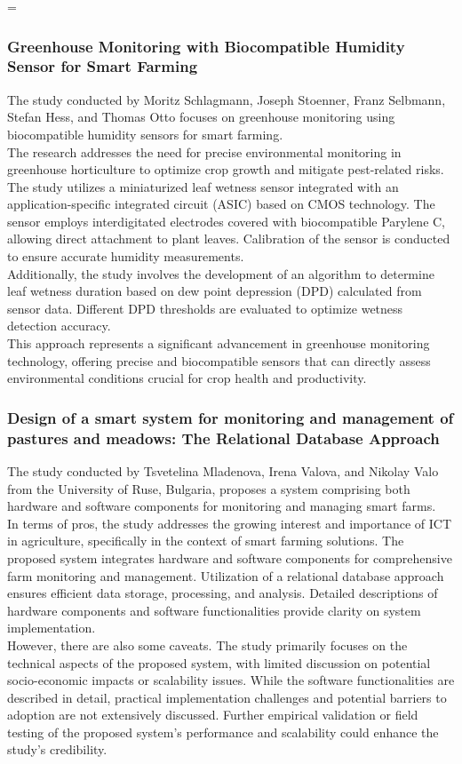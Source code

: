 =\documentclass[12pt, a4paper]{article}
\begin{document}
\subsubsection{Greenhouse Monitoring with Biocompatible Humidity Sensor for Smart Farming}
The study conducted by Moritz Schlagmann, Joseph Stoenner, Franz Selbmann, Stefan Hess, and Thomas Otto \cite{schlagmann2023greenhouse} focuses on greenhouse monitoring using biocompatible humidity sensors for smart farming.\\
The research addresses the need for precise environmental monitoring in greenhouse horticulture to optimize crop growth and mitigate pest-related risks.\\
The study utilizes a miniaturized leaf wetness sensor integrated with an application-specific integrated circuit (ASIC) based on CMOS technology. The sensor employs interdigitated electrodes covered with biocompatible Parylene C, allowing direct attachment to plant leaves. Calibration of the sensor is conducted to ensure accurate humidity measurements.\\
Additionally, the study involves the development of an algorithm to determine leaf wetness duration based on dew point depression (DPD) calculated from sensor data. Different DPD thresholds are evaluated to optimize wetness detection accuracy.\\
This approach represents a significant advancement in greenhouse monitoring technology, offering precise and biocompatible sensors that can directly assess environmental conditions crucial for crop health and productivity.
 
 \subsubsection{Design of a smart system for monitoring and management of pastures and meadows: The Relational Database Approach}
The study conducted by Tsvetelina Mladenova, Irena Valova, and Nikolay Valo \cite{mladenova2022design} from the University of Ruse, Bulgaria, proposes a system comprising both hardware and software components for monitoring and managing smart farms.\\
In terms of pros, the study addresses the growing interest and importance of ICT in agriculture, specifically in the context of smart farming solutions. The proposed system integrates hardware and software components for comprehensive farm monitoring and management. Utilization of a relational database approach ensures efficient data storage, processing, and analysis. Detailed descriptions of hardware components and software functionalities provide clarity on system implementation.\\
However, there are also some caveats. The study primarily focuses on the technical aspects of the proposed system, with limited discussion on potential socio-economic impacts or scalability issues. While the software functionalities are described in detail, practical implementation challenges and potential barriers to adoption are not extensively discussed. Further empirical validation or field testing of the proposed system's performance and scalability could enhance the study's credibility.
\end{document}
